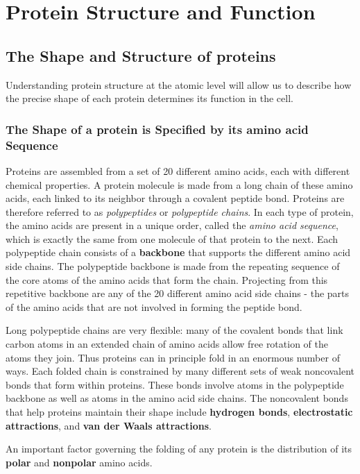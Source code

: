 \chapter{Protein Structure and Function}

\section{The Shape and Structure of proteins}

Understanding protein
structure at the atomic level will allow us to describe how the precise
shape of each protein determines its function in the cell.

\subsection{The Shape of a protein is Specified by its amino acid Sequence}

Proteins are assembled from a set of 20 different amino acids, each with different chemical properties. A protein
molecule is made from a long chain of these amino acids, each linked
to its neighbor through a covalent peptide bond. Proteins
are therefore referred to as \textit{polypeptides} or \textit{polypeptide chains}. In each
type of protein, the amino acids are present in a unique order, called the
\textit{amino acid sequence}, which is exactly the same from one molecule
of that protein to the next.
Each polypeptide chain consists of a \textbf{backbone} that supports the different
amino acid side chains. The polypeptide backbone is made from
the repeating sequence of the core atoms of the amino acids that form
the chain. Projecting from this repetitive backbone are any of the 20 different
amino acid side chains - the parts of the amino acids that are not
involved in forming the peptide bond.

Long polypeptide chains are very flexible: many of the covalent bonds
that link carbon atoms in an extended chain of amino acids allow free
rotation of the atoms they join. Thus proteins can in principle fold in an
enormous number of ways. Each folded chain is constrained by many different
sets of weak noncovalent bonds that form within proteins. These
bonds involve atoms in the polypeptide backbone as well as atoms in
the amino acid side chains. The noncovalent bonds that help proteins
maintain their shape include \textbf{hydrogen bonds}, \textbf{electrostatic attractions},
and \textbf{van der Waals attractions}.

An important factor governing the folding of any protein is the distribution
of its \textbf{polar} and \textbf{nonpolar} amino acids.

